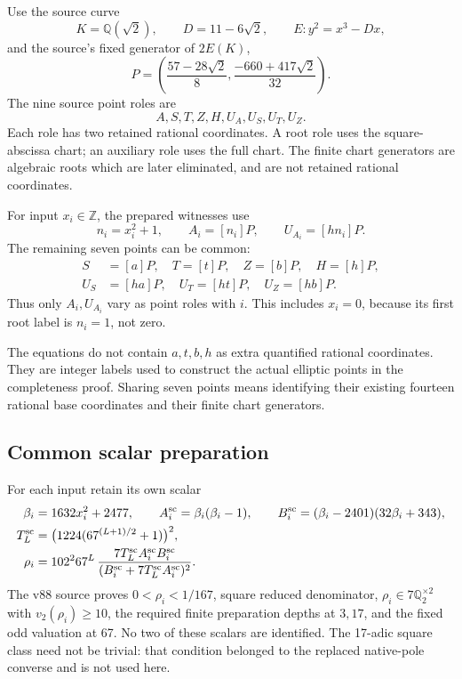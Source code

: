 \documentclass[11pt]{article}
\begin{document}
Use the source curve
\[
 K=\mathbb Q(\sqrt2),\qquad D=11-6\sqrt2,\qquad
 E:y^2=x^3-Dx,
\]
and the source's fixed generator of $2E(K)$,
\[
 P=\left(\frac{57-28\sqrt2}{8},\frac{-660+417\sqrt2}{32}\right).
\]
The nine source point roles
are
\[
                     A,S,T,Z,H,U_A,U_S,U_T,U_Z.
\]
Each role has two retained rational coordinates.  A root role uses
the square-abscissa chart; an auxiliary role uses the full chart.
The finite chart generators are algebraic roots which are later
eliminated, and are not retained rational coordinates.

For input $x_i\in\mathbb Z$, the prepared witnesses use
\[
 n_i=x_i^2+1,\qquad A_i=[n_i]P,\qquad U_{A_i}=[hn_i]P.
\]
The remaining seven points can be common:
\[
 \begin{split}
 S&=[a]P,\quad T=[t]P,\quad Z=[b]P,\quad H=[h]P,\\
 U_S&=[ha]P,\quad U_T=[ht]P,\quad U_Z=[hb]P.
 \end{split}
\]
Thus only $A_i,U_{A_i}$ vary as point roles with $i$.  This includes
$x_i=0$, because its first root label is $n_i=1$, not zero.

The equations do not contain $a,t,b,h$ as extra quantified rational
coordinates.  They are integer labels used to construct the actual
elliptic points in the completeness proof.  Sharing seven points
means identifying their existing fourteen rational base coordinates
and their finite chart generators.

\subsection{Common scalar preparation}

For each input retain its own scalar
\[
 \begin{split}
 \beta_i&=1632x_i^2+2477,\qquad
 A_i^{\rm sc}=\beta_i(\beta_i-1),\qquad
 B_i^{\rm sc}=(\beta_i-2401)(32\beta_i+343),\\
 T_L^{\rm sc}&=\bigl(1224(67^{(L+1)/2}+1)\bigr)^2,\\
 \rho_i&=102^2 67^L\,
       \frac{7T_L^{\rm sc}A_i^{\rm sc}B_i^{\rm sc}}
            {(B_i^{\rm sc}+7T_L^{\rm sc}A_i^{\rm sc})^2}.
 \end{split}
\]
The v88 source proves $0<\rho_i<1/167$, square reduced denominator,
$\rho_i\in7\mathbb Q_2^{\times2}$ with $v_2(\rho_i)\ge10$,
the required finite preparation depths at $3,17$, and the fixed odd
valuation at 67.  No two of these scalars are identified.  The
17-adic square class need not be trivial: that condition belonged
to the replaced native-pole converse and is not used here.
\end{document}
